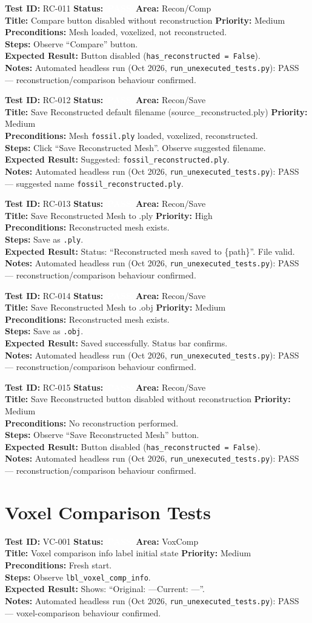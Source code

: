 \documentclass[12pt,a4paper]{article}
\newcommand{\statuspass}{\colorbox{statusgreen}{\textcolor{white}{\textbf{\,PASS\,}}}}
\newcommand{\testcase}[9]{%
  \smallskip
  \noindent\textbf{Test ID:} #1 \hfill \textbf{Status:} #2 \hfill \textbf{Area:} #3 \\
  \textbf{Title:} #4 \hfill \textbf{Priority:} #5 \\[0.3em]
  \textbf{Preconditions:} #6 \\[0.3em]
  \textbf{Steps:} #7 \\[0.3em]
  \textbf{Expected Result:} #8 \\
  \textbf{Notes:} #9
  \smallskip
}
\begin{document}
\testcase{RC-011}{\statuspass}{Recon/Comp}{Compare button disabled without reconstruction}{Medium}{Mesh loaded, voxelized, not reconstructed.}{Observe ``Compare'' button.}{Button disabled (\texttt{has\_reconstructed = False}).}{Automated headless run (Oct 2026, \texttt{run\_unexecuted\_tests.py}): PASS --- reconstruction/comparison behaviour confirmed.}


\testcase{RC-012}{\statuspass}{Recon/Save}{Save Reconstructed default filename (source\_reconstructed.ply)}{Medium}{Mesh \texttt{fossil.ply} loaded, voxelized, reconstructed.}{Click ``Save Reconstructed Mesh''. Observe suggested filename.}{Suggested: \texttt{fossil\_reconstructed.ply}.}{Automated headless run (Oct 2026, \texttt{run\_unexecuted\_tests.py}): PASS --- suggested name \texttt{fossil\_reconstructed.ply}.}


\testcase{RC-013}{\statuspass}{Recon/Save}{Save Reconstructed Mesh to .ply}{High}{Reconstructed mesh exists.}{Save as \texttt{.ply}.}{Status: ``Reconstructed mesh saved to \{path\}''. File valid.}{Automated headless run (Oct 2026, \texttt{run\_unexecuted\_tests.py}): PASS --- reconstruction/comparison behaviour confirmed.}


\testcase{RC-014}{\statuspass}{Recon/Save}{Save Reconstructed Mesh to .obj}{Medium}{Reconstructed mesh exists.}{Save as \texttt{.obj}.}{Saved successfully. Status bar confirms.}{Automated headless run (Oct 2026, \texttt{run\_unexecuted\_tests.py}): PASS --- reconstruction/comparison behaviour confirmed.}


\testcase{RC-015}{\statuspass}{Recon/Save}{Save Reconstructed button disabled without reconstruction}{Medium}{No reconstruction performed.}{Observe ``Save Reconstructed Mesh'' button.}{Button disabled (\texttt{has\_reconstructed = False}).}{Automated headless run (Oct 2026, \texttt{run\_unexecuted\_tests.py}): PASS --- reconstruction/comparison behaviour confirmed.}



\section{Voxel Comparison Tests}

\testcase{VC-001}{\statuspass}{VoxComp}{Voxel comparison info label initial state}{Medium}{Fresh start.}{Observe \texttt{lbl\_voxel\_comp\_info}.}{Shows: ``Original: ---\quad Current: ---''.}{Automated headless run (Oct 2026, \texttt{run\_unexecuted\_tests.py}): PASS --- voxel-comparison behaviour confirmed.}
\end{document}

